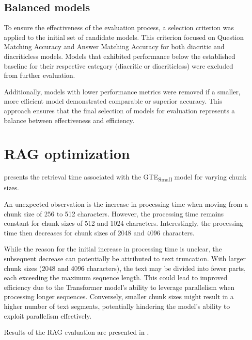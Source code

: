\subsection{Balanced models}
To ensure the effectiveness of the evaluation process, a selection criterion was applied to the initial set of candidate models.
This criterion focused on Question Matching Accuracy and Answer Matching Accuracy for both diacritic and diacriticless models.
Models that exhibited performance below the established baseline for their respective category (diacritic or diacriticless) were excluded from further evaluation.

Additionally, models with lower performance metrics were removed if a smaller, more efficient model demonstrated comparable or superior accuracy.
This approach ensures that the final selection of models for evaluation represents a balance between effectiveness and efficiency.



\section{\ac{RAG} optimization}

 presents the retrieval time associated with the \ac{GTE}\textsubscript{Small} model for varying chunk sizes.



An unexpected observation is the increase in processing time when moving from a chunk size of 256 to 512 characters.
However, the processing time remains constant for chunk sizes of 512 and 1024 characters.
Interestingly, the processing time then decreases for chunk sizes of 2048 and 4096 characters.

While the reason for the initial increase in processing time is unclear, the subsequent decrease can potentially be attributed to text truncation.
With larger chunk sizes (2048 and 4096 characters), the text may be divided into fewer parts, each exceeding the maximum sequence length.
This could lead to improved efficiency due to the Transformer model's ability to leverage parallelism when processing longer sequences.
Conversely, smaller chunk sizes might result in a higher number of text segments, potentially hindering the model's ability to exploit parallelism effectively.


Results of the \ac{RAG} evaluation are presented in .


